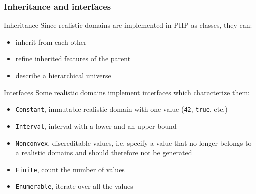 \documentclass[9pt]{beamer}
\newcommand{\code}[1]{\texttt{#1}}
\begin{document}
\begin{frame}
\frametitle{Inheritance and interfaces}

\begin{block}{Inheritance}
Since realistic domains are implemented in PHP as classes, they can:
\begin{itemize}
\item inherit from each other
\item refine inherited features of the parent
\item describe a hierarchical universe
\end{itemize}
\end{block}

\begin{block}{Interfaces}
Some realistic domains implement interfaces which characterize them:
\begin{itemize}
\item \code{Constant}, immutable realistic domain with one value (\code{42},
\code{true}, etc.)
\item \code{Interval}, interval with a lower and an upper bound
\item \code{Nonconvex}, discreditable values, i.e. specify a value that no
longer belongs to a realistic domains and should therefore not be generated
\item \code{Finite}, count the number of values
\item \code{Enumerable}, iterate over all the values
\end{itemize}
\end{block}

\end{frame}
\end{document}

